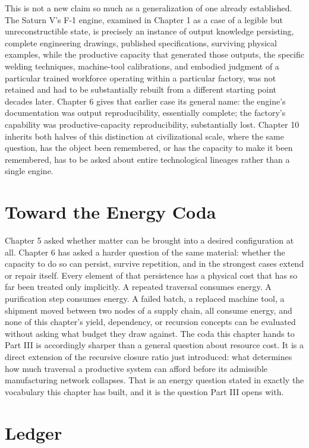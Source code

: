 \documentclass[11pt]{book}
\begin{document}
This is not a new claim so much as a generalization of one already established. The Saturn V's F-1 engine, examined in Chapter 1 as a case of a legible but unreconstructible state, is precisely an instance of output knowledge persisting, complete engineering drawings, published specifications, surviving physical examples, while the productive capacity that generated those outputs, the specific welding techniques, machine-tool calibrations, and embodied judgment of a particular trained workforce operating within a particular factory, was not retained and had to be substantially rebuilt from a different starting point decades later. Chapter 6 gives that earlier case its general name: the engine's documentation was output reproducibility, essentially complete; the factory's capability was productive-capacity reproducibility, substantially lost. Chapter 10 inherits both halves of this distinction at civilizational scale, where the same question, has the object been remembered, or has the capacity to make it been remembered, has to be asked about entire technological lineages rather than a single engine.

\section{Toward the Energy Coda}

Chapter 5 asked whether matter can be brought into a desired configuration at all. Chapter 6 has asked a harder question of the same material: whether the capacity to do so can persist, survive repetition, and in the strongest cases extend or repair itself. Every element of that persistence has a physical cost that has so far been treated only implicitly. A repeated traversal consumes energy. A purification step consumes energy. A failed batch, a replaced machine tool, a shipment moved between two nodes of a supply chain, all consume energy, and none of this chapter's yield, dependency, or recursion concepts can be evaluated without asking what budget they draw against. The coda this chapter hands to Part III is accordingly sharper than a general question about resource cost. It is a direct extension of the recursive closure ratio just introduced: what determines how much traversal a productive system can afford before its admissible manufacturing network collapses. That is an energy question stated in exactly the vocabulary this chapter has built, and it is the question Part III opens with.

\section{Ledger}
\end{document}
